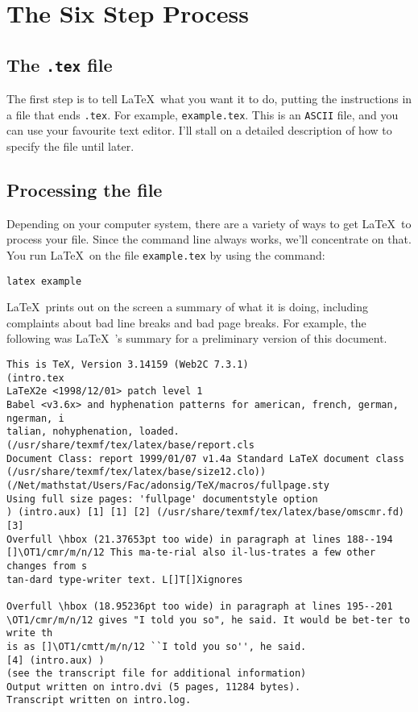 \documentclass[12pt]{article}
\newcommand{\latex}{\LaTeX\ }
\begin{document}
\section{The Six Step Process}

\subsection{The \texttt{.tex} file}

The first step is to tell \latex what you want it to do, putting
the instructions in a file that ends \texttt{.tex}.  For example,
\texttt{example.tex}.
This is an \texttt{ASCII} file, and you can use your favourite
text editor.
I'll stall on a detailed description of how to specify the file
until later.

\subsection{Processing the file}

Depending on your computer system, there are a variety of
ways to get \latex to process your file.
Since the command line always works, we'll concentrate on that.
You run \latex on the file \texttt{example.tex} by using the
command:

\begin{verbatim}
latex example
\end{verbatim}

\latex prints out on the screen a summary of what it is doing,
including complaints about bad line breaks and bad page breaks.
For example, the following was \latex's summary for a preliminary
version of this document.

\begin{verbatim}
This is TeX, Version 3.14159 (Web2C 7.3.1)
(intro.tex
LaTeX2e <1998/12/01> patch level 1
Babel <v3.6x> and hyphenation patterns for american, french, german, ngerman, i
talian, nohyphenation, loaded.
(/usr/share/texmf/tex/latex/base/report.cls
Document Class: report 1999/01/07 v1.4a Standard LaTeX document class
(/usr/share/texmf/tex/latex/base/size12.clo))
(/Net/mathstat/Users/Fac/adonsig/TeX/macros/fullpage.sty
Using full size pages: 'fullpage' documentstyle option
) (intro.aux) [1] [1] [2] (/usr/share/texmf/tex/latex/base/omscmr.fd) [3]
Overfull \hbox (21.37653pt too wide) in paragraph at lines 188--194
[]\OT1/cmr/m/n/12 This ma-te-rial also il-lus-trates a few other changes from s
tan-dard type-writer text. L[]T[]Xignores

Overfull \hbox (18.95236pt too wide) in paragraph at lines 195--201
\OT1/cmr/m/n/12 gives "I told you so", he said. It would be bet-ter to write th
is as []\OT1/cmtt/m/n/12 ``I told you so'', he said. 
[4] (intro.aux) )
(see the transcript file for additional information)
Output written on intro.dvi (5 pages, 11284 bytes).
Transcript written on intro.log.
\end{verbatim}
\end{document}
